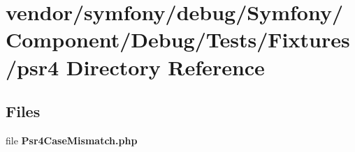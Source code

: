 \section{vendor/symfony/debug/\+Symfony/\+Component/\+Debug/\+Tests/\+Fixtures/psr4 Directory Reference}
\label{dir_9c348b6e7be28915f25742ba0fdbdb04}
\subsection*{Files}
\begin{DoxyCompactItemize}
\item 
file {\bf Psr4\+Case\+Mismatch.\+php}
\end{DoxyCompactItemize}
